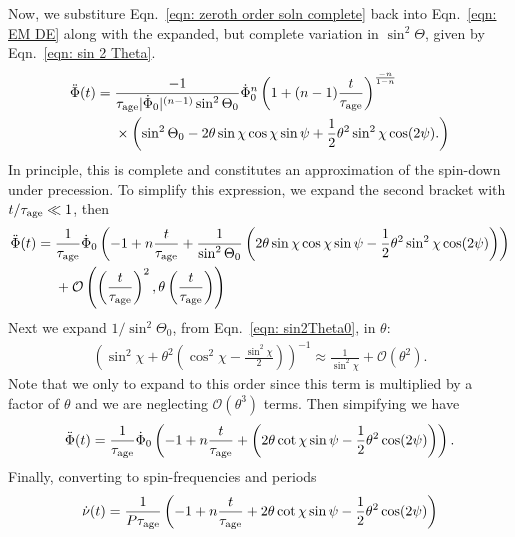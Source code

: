 \documentclass[../full_thesis/full_thesis.tex]{subfiles}
\begin{document}
Now, we substiture Eqn.~\eqref{eqn: zeroth order soln complete} back into
Eqn.~\eqref{eqn: EM DE} along with the expanded, but complete variation in
$\sin^{2}\Theta$, given by Eqn.~\eqref{eqn: sin 2 Theta}.
\begin{align}
\begin{split}
\ddot{\Phi}(t)  = {} & \frac{-1}{\tau_{\mathrm{age}} |\dot{\Phi}_0|^{(n-1)} \sin^{2}\Theta_0}
\dot{\Phi}_0^n\left(1 + (n-1)\frac{t}{\tau_{\mathrm{age}}}\right)^{\frac{-n}{1-n}} \\
& \times \left(\sin^{2}\Theta_0
- 2\theta \sin\chi\cos\chi \sin\psi
 + \frac{1}{2}\theta^{2}\sin^{2}\chi\cos(2\psi).
\right)
\end{split}
\end{align}
In principle, this is complete and constitutes an approximation of the spin-down
under precession.
To simplify this expression, we expand the second bracket with $t/\tau_{\mathrm{age}}\ll1$, then
\begin{align}
\begin{split}
\ddot{\Phi}(t) = {} & \frac{1}{\tau_{\mathrm{age}}} \dot{\Phi}_0
\left(-1 + n\frac{t}{\tau_{\mathrm{age}}} +
\frac{1}{\sin^{2}\Theta_0}\left(
2\theta \sin\chi\cos\chi \sin\psi
- \frac{1}{2}\theta^{2}\sin^{2}\chi\cos(2\psi)
\right)\right) \\
& +
\mathcal{O}\left(\left(\frac{t}{\tau_{\mathrm{age}}}\right)^{2},
                 \theta\left(\frac{t}{\tau_{\mathrm{age}}}\right)\right)
\end{split}
\end{align}
Next we expand $1/\sin^{2}\Theta_0$, from Eqn.~\eqref{eqn: sin2Theta0}, in $\theta$:
\begin{align}
\left(\sin^{2}\chi + \theta^{2}\left(\cos^{2}\chi - \frac{\sin^{2}\chi}{2}\right)\right)^{-1}
\approx
\frac{1}{\sin^{2}\chi} + \mathcal{O}(\theta^{2}).
\end{align}
Note that we only to expand to this order since this term is multiplied by a
factor of $\theta$ and we are neglecting $\mathcal{O}(\theta^{3})$ terms.
Then simpifying we have
\begin{align}
\ddot{\Phi}(t) = \frac{1}{\tau_{\mathrm{age}}} \dot{\Phi}_0
\left(-1 + n \frac{t}{\tau_{\mathrm{age}}} +
\left( 2\theta \cot\chi \sin\psi
- \frac{1}{2}\theta^{2}\cos(2\psi)
\right)\right).
\end{align}
Finally, converting to spin-frequencies and periods
\begin{align}
\dot{\nu}(t) = \frac{1}{P\tau_{\mathrm{age}}}
\left(-1 + n \frac{t}{\tau_{\mathrm{age}}} +
2\theta \cot\chi \sin\psi
- \frac{1}{2}\theta^{2}\cos(2\psi)
\right)
\label{eqn: spin-down rate}
\end{align}
\end{document}
